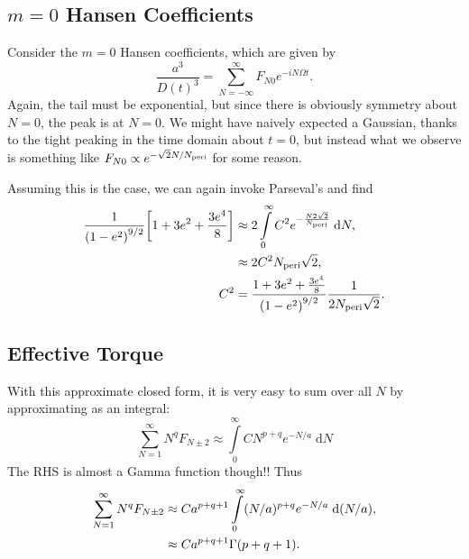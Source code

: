 \documentclass[11pt,
        usenames, %
        dvipsnames %
    ]{article}
\DeclarePairedDelimiter\p{\lparen}{\rparen}
\DeclarePairedDelimiter\s{\lbrack}{\rbrack}
\begin{document}
\subsection{$m = 0$ Hansen Coefficients}

Consider the $m = 0$ Hansen coefficients, which are given by
\begin{equation}
    \frac{a^3}{D(t)^3} = \sum\limits_{N = -\infty}^\infty
        F_{N0} e^{-iN\Omega t}.
\end{equation}
Again, the tail must be exponential, but since there is obviously symmetry about
$N = 0$, the peak is at $N = 0$. We might have naively expected a Gaussian,
thanks to the tight peaking in the time domain about $t = 0$, but instead what
we observe is something like $F_{N0} \propto e^{-\sqrt{2}N/N_{\rm peri}}$ for
some reason.

Assuming this is the case, we can again invoke Parseval's and find
\begin{align}
    \frac{1}{\p*{1 - e^2}^{9/2}}\s*{1 + 3e^2 + \frac{3e^4}{8}}
        &\approx 2\int\limits_0^\infty C^2e^{-\frac{N2\sqrt{2}}{N_{\rm peri}}}
            \;\mathrm{d}N,\\
        &\approx 2C^2N_{\rm peri}\sqrt{2},\\
    C^2 &= \frac{1 + 3e^2 + \frac{3e^4}{8}}{\p*{1 - e^2}^{9/2}}
        \frac{1}{2N_{\rm peri}\sqrt{2}}.
\end{align}

\subsection{Effective Torque}

With this approximate closed form, it is very easy to sum over all $N$ by
approximating as an integral:
\begin{equation}
    \sum\limits_{N = 1}^\infty N^q F_{N \pm 2}
        \approx \int\limits_0^\infty CN^{p + q}e^{-N/a}\;\mathrm{d}N
\end{equation}
The RHS is almost a Gamma function though!! Thus
\begin{align}
    \sum\limits_{N = 1}^\infty N^q F_{N \pm 2} &\approx
        Ca^{p + q + 1}
        \int\limits_0^\infty (N / a)^{p + q}e^{-N/a}\;\mathrm{d}(N/a),\\
        &\approx Ca^{p + q + 1} \Gamma\p*{p + q + 1}.
\end{align}
\end{document}
